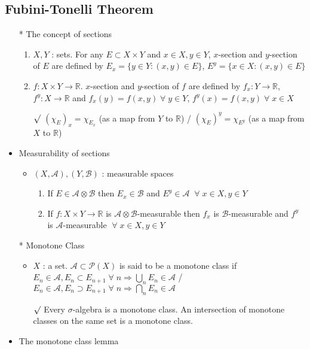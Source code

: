 \documentclass[12pt]{article}
\newcommand{\rmk}{$\surd$}
\newcommand{\R}{\mathbb{R}}
\newcommand{\A}{\mathcal{A}}
\newcommand{\B}{\mathcal{B}}
\newcommand{\forany}{\; \forall \;}
\begin{document}
\subsection{Fubini-Tonelli Theorem}
\smallskip
\begin{itemize}
    \item [*] The concept of sections
    \begin{enumerate}
        \item $X,Y$ : sets. For any $E\subset X\times Y$ and $x\in X, y\in Y$, $x$-section and $y$-section of $E$ are defined by $E_x=\{y\in Y : (x,y)\in E\}$, $E^y=\{x\in X : (x,y)\in E\}$
        \item $f : X\times Y\rightarrow \R$. $x$-section and $y$-section of $f$ are defined by $f_x : Y\rightarrow \R$, $f^y:X\rightarrow \R$ and $f_x(y)=f(x,y)\forany y\in Y$, $f^y(x)=f(x,y)\forany x\in X$
        \item [\rmk] $(\chi_E)_x=\chi_{E_x}$ (as a map from $Y$ to $\R$) / $(\chi_E)^y=\chi_{E^y}$ (as a map from $X$ to $\R$)
    \end{enumerate}
    \item Measurability of sections
    \begin{itemize}
        \item $(X, \A), (Y,\B)$ : measurable spaces
        \begin{enumerate}
            \item If $E\in \A\otimes \B$ then $E_x\in \B$ and $E^y\in \A \;\forany x\in X, y\in Y$
            \item If $f:X\times Y\rightarrow \R$ is $\A\otimes \B$-measurable then $f_x$ is $\B$-measurable and $f^y$ is $\A$-measurable \;$\forany x\in X, y\in Y$
        \end{enumerate}
    \end{itemize}
    \item [*] Monotone Class
    \begin{itemize}
        \item $X$ : a set. $\A\subset \mathcal{P}(X)$ is said to be a monotone class if \\$E_n\in \A, E_n\subset E_{n+1}\forany n\Rightarrow \bigcup_n E_n\in \A$ / $E_n\in \A, E_n\supset E_{n+1}\forany n\Rightarrow \bigcap_n E_n\in \A$
        \item [\rmk] Every $\sigma$-algebra is a monotone class. An intersection of monotone classes on the same set is a monotone class. 
    \end{itemize}
    \item The monotone class lemma

\end{itemize}
\end{document}
